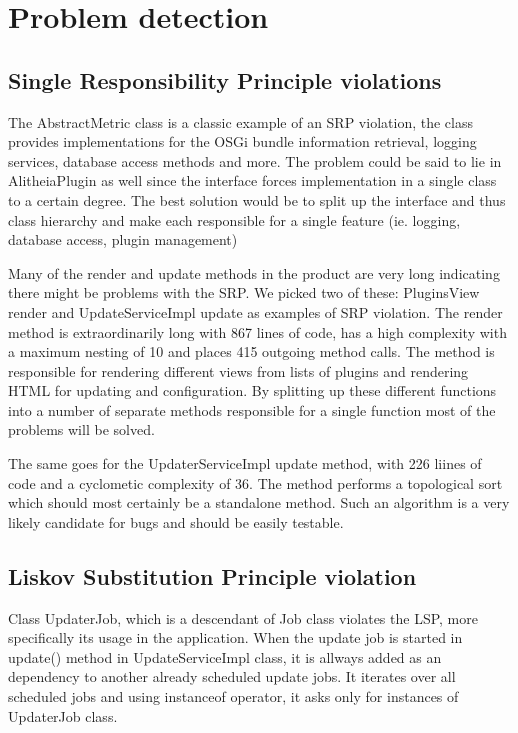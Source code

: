 \documentclass[a4paper,11pt,titlepage]{article}
\begin{document}
\section{Problem detection}

\subsection{Single Responsibility Principle violations}
The AbstractMetric class is a classic example of an SRP violation, the class provides implementations for the OSGi bundle information retrieval, logging services, database access methods and more. The problem could be said to lie in AlitheiaPlugin as well since the interface forces implementation in a single class to a certain degree. The best solution would be to split up the interface and thus class hierarchy and make each responsible for a single feature (ie. logging, database access, plugin management)

Many of the render and update methods in the product are very long indicating there might be problems with the SRP. We picked two of these: PluginsView render and UpdateServiceImpl update as examples of SRP violation. The render method is extraordinarily long with 867 lines of code, has a high complexity with a maximum nesting of 10 and places 415 outgoing method calls. The method is responsible for rendering different views from lists of plugins and rendering HTML for updating and configuration. By splitting up these different functions into a number of separate methods responsible for a single function most of the problems will be solved.

The same goes for the UpdaterServiceImpl update method, with 226 liines of code and a cyclometic complexity of 36. The method performs a topological sort which should most certainly be a standalone method. Such an algorithm is a very likely candidate for bugs and should be easily testable.

\subsection{Liskov Substitution Principle violation}
Class UpdaterJob, which is a descendant of Job class violates the LSP, more specifically its usage in the application. When the update job is started in update() method in UpdateServiceImpl class, it is allways added as an dependency to another already scheduled update jobs. It iterates over all scheduled jobs and using instanceof operator, it asks only for instances of UpdaterJob class.
\end{document}

